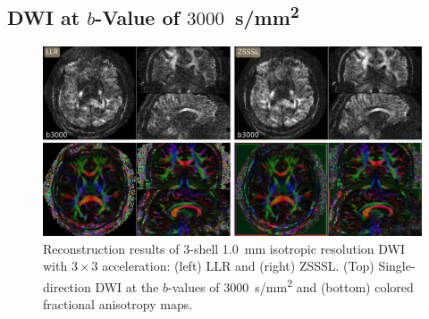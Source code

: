 \documentclass[journal,twoside,web]{ieeecolor}
\begin{document}


	\subsection{DWI at $b$-Value of $3000$~\si{s/mm^2}}

	\begin{figure}
		\includegraphics[width=\textwidth]{../figures/fig7.png}
		\caption{Reconstruction results of 3-shell \SI{1.0}{mm} isotropic resolution
			DWI with $3 \times 3$ acceleration: (left) LLR and (right) ZSSSL.
			(Top) Single-direction DWI at the $b$-values of
			\SI{3000}{s/mm^2} and 
			(bottom) colored fractional anisotropy maps.}
		\label{FIG:B3000}
	\end{figure}
\end{document}
